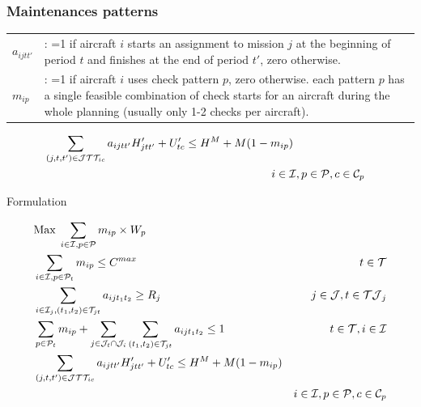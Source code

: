 \begin{frame}
\frametitle{\textbf{Maintenances patterns}}

  \begin{tabular}{p{15mm}p{110mm}}
    $a_{ijtt'}$ & : =1 if aircraft $i$ starts an assignment to mission $j$ at the beginning of period $t$ and finishes at the end of period $t'$, zero otherwise.  \\
    $m_{ip}$ &: =1 if aircraft $i$ uses check pattern $p$, zero otherwise.
   each pattern $p$ has a single feasible combination of check starts for an aircraft during the whole planning (usually only 1-2 checks per aircraft). \\
  \end{tabular}

  \begin{align}
    & \sum_{(j, t, t') \in \mathcal{J}\mathcal{T}\mathcal{T}_{ic}} a_{ijtt'} H^\prime_{jtt'} + U^{\prime}_{tc} \leq H^{M} + M (1 - m_{ip}) & \notag \\
    & \hspace{200px}  i \in \mathcal{I}, p \in \mathcal{P}, c \in \mathcal{C}_p \label{eq:cycle_hours2}\\
  \end{align}

\end{frame}

\begin{frame}

  \begin{block}{Formulation}

  \begin{align}
    & \text{Max}\;
    \sum_{i \in \mathcal{I}, p \in \mathcal{P}} m_{ip} \times W_p \\
    & \sum_{i \in \mathcal{I}, p \in \mathcal{P}_{t}} m_{ip} \leq C^{max} 
            & t \in \mathcal{T} \label{eq:capacity1}\\
    & \sum_{i \in \mathcal{I}_j, (t_1, t_2) \in \mathcal{T}_{jt}} a_{ijt_1t_2} \geq R_j
            & j \in \mathcal{J}, t \in \mathcal{TJ}_j  \label{eq:missionres}\\
    & \sum_{p \in \mathcal{P}_{t}} m_{ip} + \sum_{j \in \mathcal{J}_t \cap \mathcal{J}_i} \sum_{(t_1, t_2) \in \mathcal{T}_{jt}} a_{ijt_1t_2} \leq 1 
            & t \in \mathcal{T}, i \in \mathcal{I} \label{eq:state}\\
    & \sum_{(j, t, t') \in \mathcal{J}\mathcal{T}\mathcal{T}_{ic}} a_{ijtt'} H^\prime_{jtt'} + U^{\prime}_{tc} \leq H^M + M (1 - m_{ip}) & \notag \\
      & & i \in \mathcal{I}, p \in \mathcal{P}, c \in \mathcal{C}_p \\
  \end{align}

  \end{block}

\end{frame}

